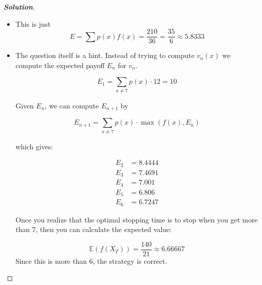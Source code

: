 \documentclass[12pt]{book}
\newenvironment{problem}[2][Problem]{\begin{trivlist}
\item[\hskip \labelsep {\bfseries #1}\hskip \labelsep {\bfseries #2.}]}{\end{trivlist}}
\newenvironment{solution}
               {\let\oldqedsymbol=\qedsymbol
                \renewcommand{\qedsymbol}{$\square$}
                \begin{proof}[\bfseries\upshape Solution]}
               {\end{proof}
                \renewcommand{\qedsymbol}{\oldqedsymbol}}
\begin{document}
\begin{problem}{4.2}
\end{problem}
\begin{solution}

\begin{itemize}
  \item[(a)] 
  This is just
  \[
  E = \sum p(x)f(x) = \frac{210}{36} = \frac{35}{6} \approx 5.8333
  \]

  \item[(b)] The question itself is a hint. Instead of trying to compute \( v_n(x) \) we compute the expected payoff \( E_n \) for \( v_n \).

  \[
  E_1 = \sum_{x \ne 7} p(x) \cdot 12 = 10
  \]

  Given \( E_n \), we can compute \( E_{n+1} \) by

  \[
  E_{n+1} = \sum_{x \ne 7} p(x) \cdot \max(f(x), E_n)
  \]

  which gives:

  \[
  \begin{aligned}
    E_2 &= 8.4444 \\
    E_3 &= 7.4691 \\
    E_4 &= 7.001 \\
    E_5 &= 6.806 \\
    E_6 &= 6.7247
  \end{aligned}
  \]

  Once you realize that the optimal stopping time is to stop when you get more than 7, then you can calculate the expected value:

  \[
  \mathbb{E}(f(X_T)) = \frac{140}{21} \approx 6.66667
  \]
  Since this is more than 6, the strategy is correct.

\end{itemize}
\end{solution}
\end{document}
